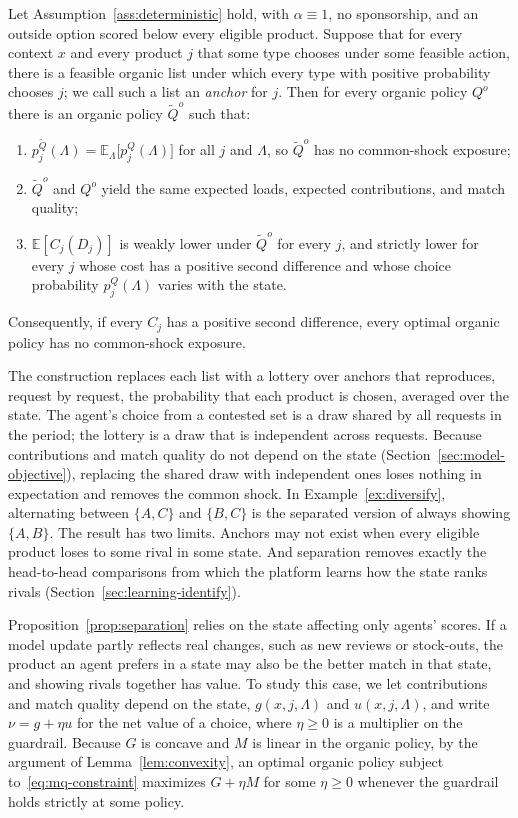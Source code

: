 \documentclass[opre,dblanonrev]{informs4}
\providecommand{\E}{\mathbb{E}}
\providecommand{\1}{\mathbf{1}}
\begin{document}
\begin{proposition}\label{prop:separation}
Let Assumption~\ref{ass:deterministic} hold, with $\alpha\equiv1$, no sponsorship, and an outside option scored below every eligible product. Suppose that for every context $x$ and every product $j$ that some type chooses under some feasible action, there is a feasible organic list under which every type with positive probability chooses $j$; we call such a list an \emph{anchor} for $j$. Then for every organic policy $Q^o$ there is an organic policy $\tilde Q^o$ such that:
\begin{enumerate}
\item[(a)] $p_j^{\tilde Q}(\Lambda)=\E_\Lambda\bigl[p_j^{Q}(\Lambda)\bigr]$ for all $j$ and $\Lambda$, so $\tilde Q^o$ has no common-shock exposure;
\item[(b)] $\tilde Q^o$ and $Q^o$ yield the same expected loads, expected contributions, and match quality;
\item[(c)] $\E[C_j(D_j)]$ is weakly lower under $\tilde Q^o$ for every $j$, and strictly lower for every $j$ whose cost has a positive second difference and whose choice probability $p_j^{Q}(\Lambda)$ varies with the state.
\end{enumerate}
Consequently, if every $C_j$ has a positive second difference, every optimal organic policy has no common-shock exposure.
\end{proposition}

The construction replaces each list with a lottery over anchors that reproduces, request by request, the probability that each product is chosen, averaged over the state. The agent's choice from a contested set is a draw shared by all requests in the period; the lottery is a draw that is independent across requests. Because contributions and match quality do not depend on the state (Section~\ref{sec:model-objective}), replacing the shared draw with independent ones loses nothing in expectation and removes the common shock. In Example~\ref{ex:diversify}, alternating between $\{A,C\}$ and $\{B,C\}$ is the separated version of always showing $\{A,B\}$. The result has two limits. Anchors may not exist when every eligible product loses to some rival in some state. And separation removes exactly the head-to-head comparisons from which the platform learns how the state ranks rivals (Section~\ref{sec:learning-identify}).

Proposition~\ref{prop:separation} relies on the state affecting only agents' scores. If a model update partly reflects real changes, such as new reviews or stock-outs, the product an agent prefers in a state may also be the better match in that state, and showing rivals together has value. To study this case, we let contributions and match quality depend on the state, $g(x,j,\Lambda)$ and $u(x,j,\Lambda)$, and write $\nu=g+\eta u$ for the net value of a choice, where $\eta\ge0$ is a multiplier on the guardrail. Because $G$ is concave and $M$ is linear in the organic policy, by the argument of Lemma~\ref{lem:convexity}, an optimal organic policy subject to~\eqref{eq:mq-constraint} maximizes $G+\eta M$ for some $\eta\ge0$ whenever the guardrail holds strictly at some policy.
\end{document}
